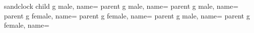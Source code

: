 sandclock{ 
 	 child{
		g{
		male,
		name={}
		}
	}
	parent{
		g{
		male,
		name={
}}	parent{
		g{
		male,
		name={
}}}	parent{
		g{
		female,
		name={
}}}}	parent{
		g{
		female,
		name={
}}	parent{
		g{
		male,
		name={
}}}	parent{
		g{
		female,
		name={
}}}}}